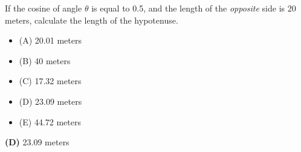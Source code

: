 

If the cosine of angle $\theta$ is equal to 0.5, and the length of the {\it opposite} side is 20 meters, calculate the length of the hypotenuse.

\begin{itemize}
\item{(A)} 20.01 meters
\vskip 5pt 
\item{(B)} 40 meters
\vskip 5pt 
\item{(C)} 17.32 meters
\vskip 5pt 
\item{(D)} 23.09 meters
\vskip 5pt 
\item{(E)} 44.72 meters
\end{itemize}







{\bf (D)} 23.09 meters
 










